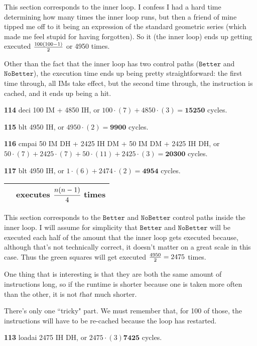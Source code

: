 \documentclass[a4paper]{article}
\begin{document}
This section corresponds to the inner loop. I confess I had a hard time determining how many times the inner loop runs, but then a friend of mine tipped me off to it being an expression of the standard geometric series (which made me feel stupid for having forgotten). So it (the inner loop) ends up getting executed ${100(100-1) \over 2}$ or 4950 times.

Other than the fact that the inner loop has two control paths ($\texttt{Better}$ and $\texttt{NoBetter}$), the execution time ends up being pretty straightforward: the first time through, all IMs take effect, but the second time through, the instruction is cached, and it ends up being a hit.

\textbf{114} deci 100 IM + 4850 IH, or $100 \cdot (7) + 4850 \cdot (3) = \mathbf{15250}$ cycles.

\textbf{115} blt 4950 IH, or $4950 \cdot (2) = \mathbf{9900}$ cycles.

\textbf{116} cmpai 50 IM DH + 2425 IH DM + 50 IM DM + 2425 IH DH, or $50 \cdot (7) + 2425 \cdot (7) + 50 \cdot (11) + 2425 \cdot (3) = \mathbf{20300}$ cycles.

\textbf{117} blt 4950 IH, or $1 \cdot (6) + 2474 \cdot (2) = \mathbf{4954}$ cycles. \\

\begin{tabular}{|c|c|}
\hline
\cellcolor{green} & executes $\cfrac{n(n-1)}{4}$ times \\
\hline
\end{tabular}

This section corresponds to the $\texttt{Better}$ and $\texttt{NoBetter}$ control paths inside the inner loop. I will assume for simplicity that $\texttt{Better}$ and $\texttt{NoBetter}$ will be executed each half of the amount that the inner loop gets executed because, although that's not technically correct, it doesn't matter on a great scale in this case. Thus the green squares will get executed ${4950 \over 2} = 2475$ times.

One thing that is interesting is that they are both the same amount of instructions long, so if the runtime is shorter because one is taken more often than the other, it is not $\textit{that}$ much shorter.

There's only one ``tricky" part. We must remember that, for 100 of those, the instructions will have to be re-cached because the loop has restarted.

\textbf{113} loadai 2475 IH DH, or $2475 \cdot (3) \mathbf{7425}$ cycles.
\end{document}
